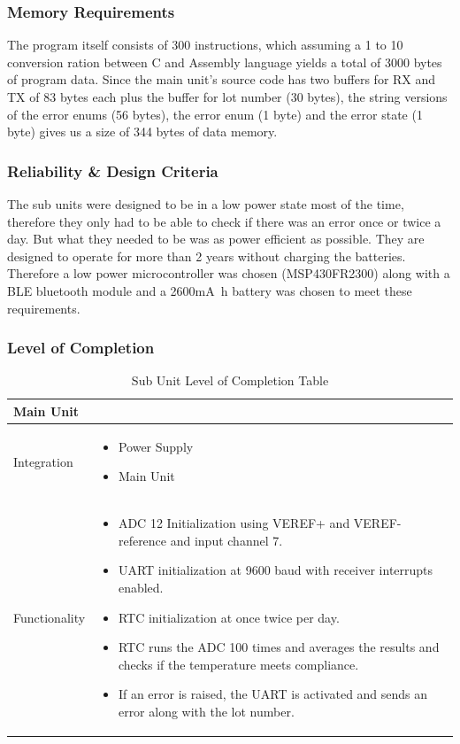 \subsubsection{Memory Requirements}
The program itself consists of 300 instructions, which assuming a 1 to 10 conversion ration between C and Assembly language yields a total of 3000 bytes of program data. Since the main unit's source code has two buffers for RX and TX of 83 bytes each plus the buffer for lot number (30 bytes), the string versions of the error enums (56 bytes), the error enum (1 byte) and the error state (1 byte) gives us a size of 344 bytes of data memory.
\subsubsection{Reliability \& Design Criteria}
The sub units were designed to be in a low power state most of the time, therefore they only had to be able to check if there was an error once or twice a day. But what they needed to be was as power efficient as possible. They are designed to operate for more than 2 years without charging the batteries. Therefore a low power microcontroller was chosen (MSP430FR2300) along with a BLE bluetooth module and a 2600\si{\milli\ampere\hour} battery was chosen to meet these requirements.
\begin{landscape}
\subsubsection{Level of Completion}
  \begin{table}[!ht]
    \begin{tabularx}{\textwidth}{|X|X|}
      \hline
      \multicolumn{2}{|X|}{Main Unit}\\
      \hline
      Integration&\begin{itemize}
                    \item Power Supply
                    \item Main Unit
                  \end{itemize}\\
                  \hline
      Functionality&\begin{itemize}
          \item ADC 12 Initialization using VEREF+ and VEREF- reference and input channel 7.
          \item UART initialization at 9600 baud with receiver interrupts enabled.
          \item RTC initialization at once twice per day.
          \item RTC runs the ADC 100 times and averages the results and checks if the temperature meets compliance.
          \item If an error is raised, the UART is activated and sends an error along with the lot number.
        \end{itemize}\\
      \hline
    \end{tabularx}
    \caption{Sub Unit Level of Completion Table}
    \label{tab:sub-unit-modular-completion-table}
  \end{table}
\end{landscape}

